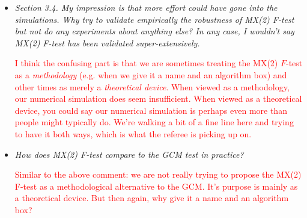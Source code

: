 \documentclass[12pt]{article}
\begin{document}
\begin{itemize}
	\item \textsl{Section 3.4. My impression is that more effort could have gone into the simulations. Why try to validate empirically the robustness of MX(2) F-test but not do any experiments about anything else? In any case, I wouldn’t say MX(2) F-test has been validated super-extensively.}
	
	\textcolor{red}{I think the confusing part is that we are sometimes treating the MX(2) $F$-test as a \textit{methodology} (e.g. when we give it a name and an algorithm box) and other times as merely a \textit{theoretical device}. When viewed as a methodology, our numerical simulation does seem insufficient. When viewed as a theoretical device, you could say our numerical simulation is perhaps even more than people might typically do. We're walking a bit of a fine line here and trying to have it both ways, which is what the referee is picking up on. }

	\item \textsl{How does MX(2) F-test compare to the GCM test in practice?}
	
	\textcolor{red}{Similar to the above comment: we are not really trying to propose the MX(2) F-test as a methodological alternative to the GCM. It's purpose is mainly as a theoretical device. But then again, why give it a name and an algorithm box?}
\end{itemize}
\end{document}
